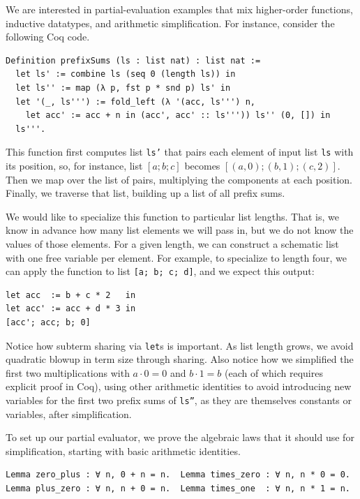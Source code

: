 We are interested in partial-evaluation examples that mix higher-order functions, inductive datatypes, and arithmetic simplification.
For instance, consider the following Coq code.

\begin{verbatim}
Definition prefixSums (ls : list nat) : list nat :=
  let ls' := combine ls (seq 0 (length ls)) in
  let ls'' := map (λ p, fst p * snd p) ls' in
  let '(_, ls''') := fold_left (λ '(acc, ls''') n,
    let acc' := acc + n in (acc', acc' :: ls''')) ls'' (0, []) in
  ls'''.
\end{verbatim}

This function first computes list \texttt{ls'} that pairs each element of input list \texttt{ls} with its position, so, for instance, list $[a; b; c]$ becomes $[(a, 0); (b, 1); (c, 2)]$.
Then we map over the list of pairs, multiplying the components at each position.
Finally, we traverse that list, building up a list of all prefix sums.

We would like to specialize this function to particular list lengths.
That is, we know in advance how many list elements we will pass in, but we do not know the values of those elements.
For a given length, we can construct a schematic list with one free variable per element.
For example, to specialize to length four, we can apply the function to list \texttt{[a; b; c; d]}, and we expect this output:
\begin{verbatim}
let acc  := b + c * 2   in
let acc' := acc + d * 3 in
[acc'; acc; b; 0]
\end{verbatim}

Notice how subterm sharing via \texttt{let}s is important.
As list length grows, we avoid quadratic blowup in term size through sharing.
Also notice how we simplified the first two multiplications with $a \cdot 0 = 0$ and $b \cdot 1 = b$ (each of which requires explicit proof in Coq), using other arithmetic identities to avoid introducing new variables for the first two prefix sums of \texttt{ls''}, as they are themselves constants or variables, after simplification.

To set up our partial evaluator, we prove the algebraic laws that it should use for simplification, starting with basic arithmetic identities.
\begin{verbatim}
Lemma zero_plus : ∀ n, 0 + n = n.  Lemma times_zero : ∀ n, n * 0 = 0.
Lemma plus_zero : ∀ n, n + 0 = n.  Lemma times_one  : ∀ n, n * 1 = n.
\end{verbatim}

